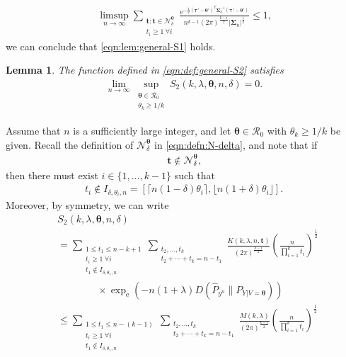 \documentclass[journal, 10pt]{IEEEtran}
\newcommand{\rme}{\mathrm{e}}
\newcommand{\cN}{\mathcal{N}}
\newcommand{\cR}{\mathcal{R}}
\theoremstyle{plain}
\theoremstyle{plain}
\newtheorem{lem}{Lemma}%
\theoremstyle{plain}
\theoremstyle{plain}
\newcommand{\boldtheta}{\mathbold{\theta}}
\newcommand{\boldtau}{\mathbold{\tau}}
\newcommand{\boldt}{\mathbold{t}}
\begin{document}
\begin{appendices}
\begin{IEEEproof}
\begin{align}
\limsup_{n\to \infty }	\sum_{\substack{ \boldt \colon \boldt \in \cN_\delta^\boldtheta \\ t_i\ge 1 \ \forall i}} \frac{\rme^{-\frac{1}{2}(\boldtau'-\boldtheta')^T \mathbold{\Sigma}_n^{-1}(\boldtau'-\boldtheta') }}{n^{k-1}(2\pi)^{\frac{k-1}{2}} |\mathbold{\Sigma}_n|^\frac{1}{2}} \le 1\text{,}
\end{align}
we can conclude that \eqref{eqn:lem:general-S1} holds.
\end{IEEEproof}
%
\begin{lem}\label{lem:generela_sum_S2}
The function defined in \eqref{eqn:def:general-S2} satisfies
\begin{align}
\lim_{n \to \infty}\sup_{\substack{\boldtheta \in \cR_0 \\ \theta_k \ge 1/k}} S_2(k, \lambda, \boldtheta,n,\delta) =0\text{.} \label{eqn:lem:general-S2}
\end{align}	
\end{lem}
\begin{IEEEproof}
Assume that $n$ is a sufficiently large integer, and let $\boldtheta \in \cR_0$ with $\theta_k \ge 1/k$ be given. 
Recall the definition of $\cN_\delta^\boldtheta$ in \eqref{eqn:defn:N-delta}, and note that if 
\begin{align}
\boldt  \not \in  \cN^\boldtheta_\delta\text{,}
\end{align}
then there must exist $i \in \{1,\hdots, k-1\}$ such that 
\begin{align}
t_i \not \in  I_{\delta, \theta_i, n}=\left[ \lceil n(1-\delta)\theta_i  \rceil , \lfloor n(1+\delta)\theta_i \rfloor  \right]\text{.} 
\end{align}
Moreover, by symmetry, we can write
\begin{align}
& S_2(k, \lambda, \boldtheta,n,\delta) \nonumber \\
&=\sum_{\substack{ 1\le t_1 \le n-k+1 \\ t_i\ge 1 \ \forall i \\ t_1 \not \in I_{\delta, \theta_1, n} }} \sum_{\substack{t_2, \hdots, t_k \\ t_2+\cdots+t_k=n-t_1}} \frac{K(k,\lambda, n, \boldt)}{(2\pi)^{\frac{k-1}{2}} } \left(\frac{n}{\prod_{i=1}^{k}t_i}\right)^\frac12 \nonumber \\ 
&\qquad \qquad \times \exp_\rme(-n(1+\lambda)D(\widehat{P}_{y^n}\| P_{Y|V=\boldtheta}))  \\
&\le 
\sum_{\substack{ 1\le t_1 \le n-(k-1) \\ t_i\ge 1 \ \forall i \\ t_1 \not \in I_{\delta, \theta_1, n} }} \sum_{\substack{t_2, \hdots, t_k \\ t_2+\cdots+t_k=n-t_1}} \frac{M(k, \lambda)}{(2\pi)^{\frac{k-1}{2}} } \left(\frac{n}{\prod_{i=1}^{k}t_i}\right)^\frac12 \nonumber \\

\end{align}
\end{IEEEproof}
\end{appendices}
\end{document}

